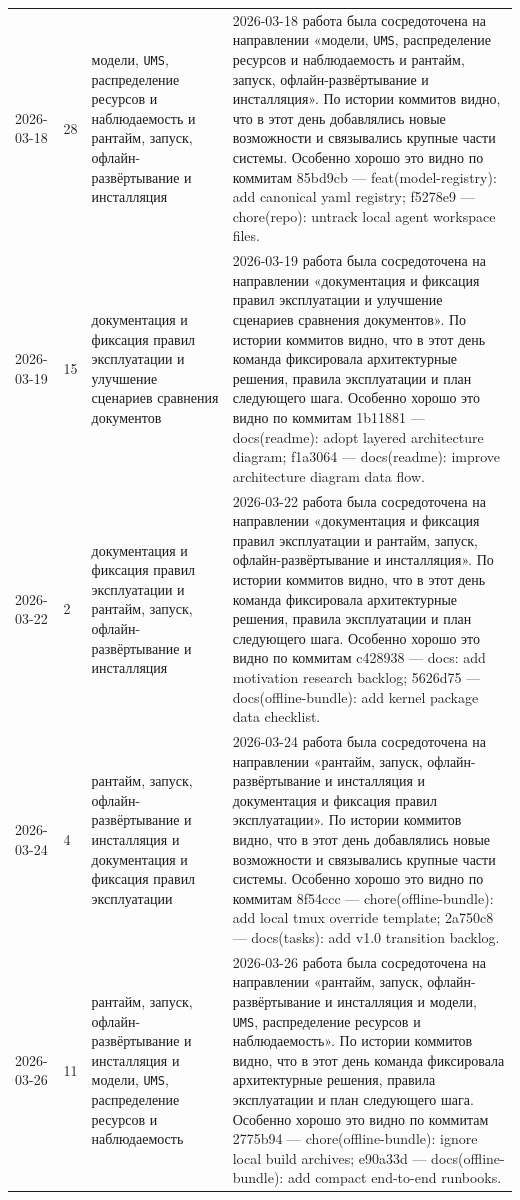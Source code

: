 \begin{longtable}{p{} p{} p{} p{}}
2026-03-18 & 28 & модели, \texttt{UMS}, распределение ресурсов и наблюдаемость и рантайм, запуск, офлайн-развёртывание и инсталляция & 2026-03-18 работа была сосредоточена на направлении «модели, \texttt{UMS}, распределение ресурсов и наблюдаемость и рантайм, запуск, офлайн-развёртывание и инсталляция». По истории коммитов видно, что в этот день добавлялись новые возможности и связывались крупные части системы. Особенно хорошо это видно по коммитам 85bd9cb — feat(model-registry): add canonical yaml registry; f5278e9 — chore(repo): untrack local agent workspace files. \\
2026-03-19 & 15 & документация и фиксация правил эксплуатации и улучшение сценариев сравнения документов & 2026-03-19 работа была сосредоточена на направлении «документация и фиксация правил эксплуатации и улучшение сценариев сравнения документов». По истории коммитов видно, что в этот день команда фиксировала архитектурные решения, правила эксплуатации и план следующего шага. Особенно хорошо это видно по коммитам 1b11881 — docs(readme): adopt layered architecture diagram; f1a3064 — docs(readme): improve architecture diagram data flow. \\
2026-03-22 & 2 & документация и фиксация правил эксплуатации и рантайм, запуск, офлайн-развёртывание и инсталляция & 2026-03-22 работа была сосредоточена на направлении «документация и фиксация правил эксплуатации и рантайм, запуск, офлайн-развёртывание и инсталляция». По истории коммитов видно, что в этот день команда фиксировала архитектурные решения, правила эксплуатации и план следующего шага. Особенно хорошо это видно по коммитам c428938 — docs: add motivation research backlog; 5626d75 — docs(offline-bundle): add kernel package data checklist. \\
2026-03-24 & 4 & рантайм, запуск, офлайн-развёртывание и инсталляция и документация и фиксация правил эксплуатации & 2026-03-24 работа была сосредоточена на направлении «рантайм, запуск, офлайн-развёртывание и инсталляция и документация и фиксация правил эксплуатации». По истории коммитов видно, что в этот день добавлялись новые возможности и связывались крупные части системы. Особенно хорошо это видно по коммитам 8f54ccc — chore(offline-bundle): add local tmux override template; 2a750c8 — docs(tasks): add v1.0 transition backlog. \\
2026-03-26 & 11 & рантайм, запуск, офлайн-развёртывание и инсталляция и модели, \texttt{UMS}, распределение ресурсов и наблюдаемость & 2026-03-26 работа была сосредоточена на направлении «рантайм, запуск, офлайн-развёртывание и инсталляция и модели, \texttt{UMS}, распределение ресурсов и наблюдаемость». По истории коммитов видно, что в этот день команда фиксировала архитектурные решения, правила эксплуатации и план следующего шага. Особенно хорошо это видно по коммитам 2775b94 — chore(offline-bundle): ignore local build archives; e90a33d — docs(offline-bundle): add compact end-to-end runbooks. \\

\end{longtable}
